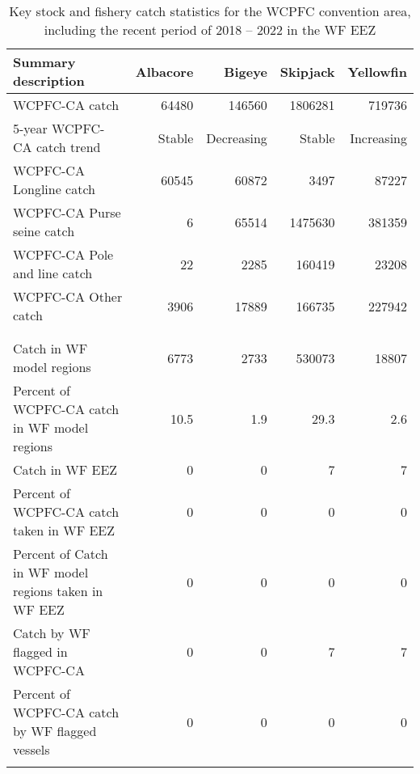 \begin{longtable}{lrrrr}
\caption{Key stock and fishery catch statistics for the WCPFC convention area, including the recent period of 2018 -- 2022 in the WF EEZ} \\ 
  \hline
Summary description & Albacore & Bigeye & Skipjack & Yellowfin \\ 
  \hline
WCPFC-CA catch & 64480 & 146560 & 1806281 & 719736 \\ 
  5-year WCPFC-CA catch trend & Stable & Decreasing & Stable & Increasing \\ 
  WCPFC-CA Longline catch & 60545 & 60872 & 3497 & 87227 \\ 
  WCPFC-CA Purse seine catch & 6 & 65514 & 1475630 & 381359 \\ 
  WCPFC-CA Pole and line catch & 22 & 2285 & 160419 & 23208 \\ 
  WCPFC-CA Other catch & 3906 & 17889 & 166735 & 227942 \\ 
   &  &  &  &  \\ 
   &  &  &  &  \\ 
   \hline
Catch in WF model regions & 6773 & 2733 & 530073 & 18807 \\ 
  Percent of WCPFC-CA catch in WF model regions & 10.5 & 1.9 & 29.3 & 2.6 \\ 
  Catch in WF EEZ & 0 & 0 & 7 & 7 \\ 
  Percent of WCPFC-CA catch taken in WF EEZ & 0 & 0 & 0 & 0 \\ 
  Percent of Catch in WF model regions taken in WF EEZ & 0 & 0 & 0 & 0 \\ 
  Catch by WF flagged in WCPFC-CA & 0 & 0 & 7 & 7 \\ 
  Percent of WCPFC-CA catch by WF flagged vessels & 0 & 0 & 0 & 0 \\ 
  \hline
\label{cat_sum_tab}
\end{longtable}
